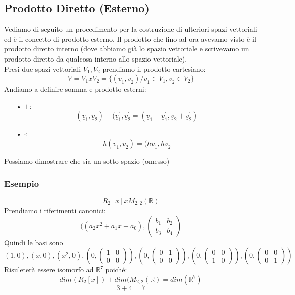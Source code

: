 \subsection{Prodotto Diretto (Esterno)}
Vediamo di seguito un procedimento per la costruzione di ulteriori spazi vettoriali ed è il concetto di prodotto
esterno. Il prodotto che fino ad ora avevamo visto è il prodotto diretto interno (dove abbiamo già lo spazio
vettoriale e scrivevamo un prodotto diretto da qualcosa interno allo spazio vettoriale).\\
Presi due spazi vettoriali $V_1, V_2$ prendiamo il prodotto cartesiano:
$$ V = V_1xV_2 = \{(\underline{v}_1,\underline{v}_2)/ \underline{v}_1 \in V_1, \underline{v}_2 \in V_2 \} $$
Andiamo a definire somma e prodotto esterni:
\begin{itemize}
\item[•]$+:$
$$ (\underline{v}_1, \underline{v}_2) + (\underline{v}_1^{\prime}, \underline{v}_2^{\prime} = (\underline{v}_1+\underline{v}_1^{\prime}, \underline{v}_2+\underline{v}_2^{\prime})$$

\item[•]$\cdot:$
$$ h(\underline{v}_1, \underline{v}_2) = (h\underline{v}_1, h \underline{v}_2$$
\end{itemize}
Possiamo dimostrare che sia un sotto spazio (omesso)\\

\subsubsection{Esempio}
$$ R_2[x]xM_{2,2}(\mathbb{R}) $$
Prendiamo i riferimenti canonici:
$$
((a_2x^2+a_1x+a_0), \begin{pmatrix}
b_1 & b_2 \\ b_3 & b_4
\end{pmatrix}
$$
Quindi le basi sono
$$ (1,0),(x,0),(x^2,0),(0, \begin{pmatrix}1&0\\0&0\end{pmatrix}),(0, \begin{pmatrix}0&1\\0&0\end{pmatrix}),(0, \begin{pmatrix}0&0\\1&0\end{pmatrix}), (0, \begin{pmatrix}0&0\\0&1\end{pmatrix})  $$
Risuleterà essere isomorfo ad $\mathbb{R}^7$ poiché:
$$ dim(R_2[x])+dim(M_{2,2}(\mathbb{R}) = dim(\mathbb{R}^7) $$
$$ 3+4=7$$






